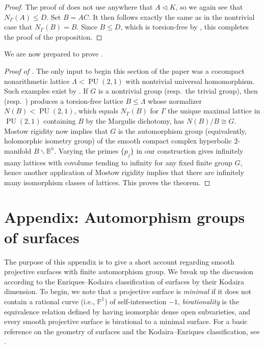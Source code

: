 \documentclass[11pt]{article}
\theoremstyle{plain}
\theoremstyle{definition}
\theoremstyle{remark}
\newcommand{\bbB}{\mathbb{B}}
\newcommand{\bbP}{\mathbb{P}}
\newcommand{\Gam}{\Gamma}
\newcommand{\Lam}{\Lambda}
\DeclareMathOperator{\PU}{PU}
\newcommand{\bs}{\backslash}
\newenvironment{pf}{\begin{proof}}{\end{proof}}
\begin{document}
\begin{pf}
The proof of  does not use anywhere that $A \triangleleft K$, so we again see that $N_\Gam(A) \le D$. Set $B = AC$. It then follows exactly the same as in the nontrivial case that $N_\Gam(B) = B$. Since $B \le D$, which is torsion-free by , this completes the proof of the proposition.
\end{pf}

We are now prepared to prove .

\begin{pf}[Proof of ]
The only input to begin this section of the paper was a cocompact nonarithmetic lattice $\Lam < \PU(2,1)$ with nontrivial universal homomorphism. Such examples exist by . If $G$ is a nontrivial group (resp.\ the trivial group), then  (resp.\ ) produces a torsion-free lattice $B \le \Lam$ whose normalizer $N(B) < \PU(2,1)$, which equals $N_\Gam(B)$ for $\Gam$ the unique maximal lattice in $\PU(2,1)$ containing $B$ by the Margulis dichotomy, has $N(B) / B \cong G$. Mostow rigidity now implies that $G$ is the automorphism group (equivalently, holomorphic isometry group) of the smooth compact complex hyperbolic $2$-manifold $B \bs \bbB^n$. Varying the primes $\{p_j\}$ in our construction gives infinitely many lattices with covolume tending to infinity for any fixed finite group $G$, hence another application of Mostow rigidity implies that there are infinitely many isomorphism classes of lattices. This proves the theorem.
\end{pf}

\section*{Appendix: Automorphism groups of surfaces}

The purpose of this appendix is to give a short account regarding smooth projective surfaces with finite automorphism group. We break up the discussion according to the Enriques--Kodaira classification of surfaces by their Kodaira dimension. To begin, we note that a projective surface is \emph{minimal} if it does not contain a rational curve (i.e., $\bbP^1$) of self-intersection $-1$, \emph{birationality} is the equivalence relation defined by having isomorphic dense open subvarieties, and every smooth projective surface is birational to a minimal surface. For a basic reference on the geometry of surfaces and the Kodaira--Enriques classification, see \cite{Beauville, BPV}.
\end{document}
